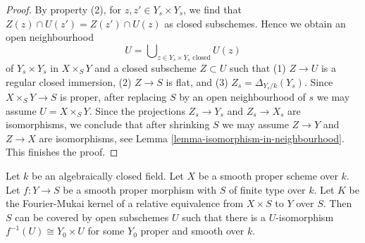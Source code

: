 \begin{proof}
\medskip\noindent
By property (2), for $z, z' \in Y_s \times Y_s$, we
find that $Z(z) \cap U(z') = Z(z') \cap U(z)$ as closed subschemes.
Hence we obtain an open neighbourhood
$$
U = \bigcup\nolimits_{z \in Y_s \times Y_s\text{ closed}} U(z)
$$
of $Y_s \times Y_s$ in $X \times_S Y$ and a closed subscheme $Z \subset U$
such that (1) $Z \to U$ is a regular closed immersion,
(2) $Z \to S$ is flat, and (3) $Z_s = \Delta_{Y_s/k}(Y_s)$.
Since $X \times_S Y \to S$ is proper, after replacing $S$
by an open neighbourhood of $s$ we may assume $U = X \times_S Y$.
Since the projections $Z_s \to Y_s$ and $Z_s \to X_s$
are isomorphisms, we conclude that after shrinking $S$
we may assume $Z \to Y$ and $Z \to X$ are isomorphisms, see
Lemma \ref{lemma-isomorphism-in-neighbourhood}.
This finishes the proof.
\end{proof}

\begin{lemma}
\label{lemma-no-deformations-better}
Let $k$ be an algebraically closed field. Let $X$
be a smooth proper scheme over $k$.
Let $f : Y \to S$ be a smooth proper morphism with $S$ of finite type over $k$.
Let $K$ be the Fourier-Mukai kernel of a relative equivalence
from $X \times S$ to $Y$ over $S$. Then $S$ can be covered by
open subschemes $U$ such that there is a $U$-isomorphism
$f^{-1}(U) \cong Y_0 \times U$ for some $Y_0$ proper and smooth over $k$.
\end{lemma}

